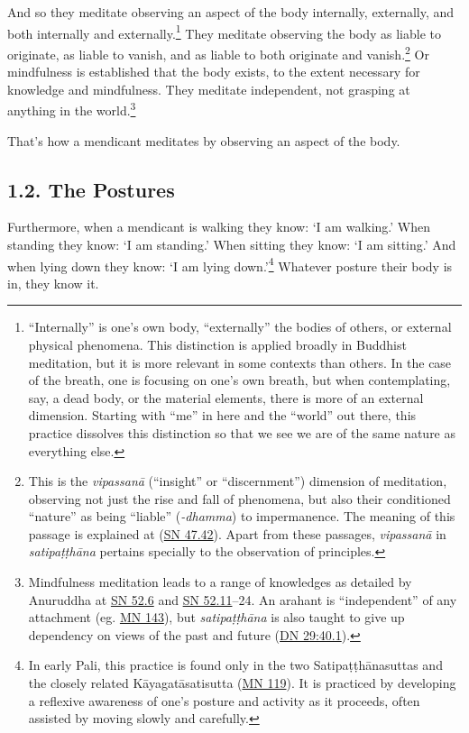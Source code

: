 \documentclass[12pt,openany]{book}%
\begin{document}
And so they meditate observing an aspect of the body internally, externally, and both internally and externally.\footnote{“Internally” is one’s own body, “externally” the bodies of others, or external physical phenomena. This distinction is applied broadly in Buddhist meditation, but it is more relevant in some contexts than others. In the case of the breath, one is focusing on one’s own breath, but when contemplating, say, a dead body, or the material elements, there is more of an external dimension. Starting with “me” in here and the “world” out there, this practice dissolves this distinction so that we see we are of the same nature as everything else. } They meditate observing the body as liable to originate, as liable to vanish, and as liable to both originate and vanish.\footnote{This is the \textit{\textsanskrit{vipassanā}} (“insight” or “discernment”) dimension of meditation, observing not just the rise and fall of phenomena, but also their conditioned “nature” as being “liable” (\textit{-dhamma}) to impermanence. The meaning of this passage is explained at (\href{https://suttacentral.net/sn47.42/en/sujato}{SN 47.42}). Apart from these passages, \textit{\textsanskrit{vipassanā}} in \textit{\textsanskrit{satipaṭṭhāna}} pertains specially to the observation of principles. } Or mindfulness is established that the body exists, to the extent necessary for knowledge and mindfulness. They meditate independent, not grasping at anything in the world.\footnote{Mindfulness meditation leads to a range of knowledges as detailed by Anuruddha at \href{https://suttacentral.net/sn52.6/en/sujato}{SN 52.6} and \href{https://suttacentral.net/sn52.11/en/sujato}{SN 52.11}–24. An arahant is “independent” of any attachment (eg. \href{https://suttacentral.net/mn143/en/sujato}{MN 143}), but \textit{\textsanskrit{satipaṭṭhāna}} is also taught to give up dependency on views of the past and future (\href{https://suttacentral.net/dn29/en/sujato\#40.1}{DN 29:40.1}). } 

That’s how a mendicant meditates by observing an aspect of the body. 

\subsection*{1.2. The Postures }

Furthermore, when a mendicant is walking they know: ‘I am walking.’ When standing they know: ‘I am standing.’ When sitting they know: ‘I am sitting.’ And when lying down they know: ‘I am lying down.’\footnote{In early Pali, this practice is found only in the two \textsanskrit{Satipaṭṭhānasuttas} and the closely related \textsanskrit{Kāyagatāsatisutta} (\href{https://suttacentral.net/mn119/en/sujato}{MN 119}). It is practiced by developing a reflexive awareness of one’s posture and activity as it proceeds, often assisted by moving slowly and carefully. } Whatever posture their body is in, they know it. 
\end{document}
